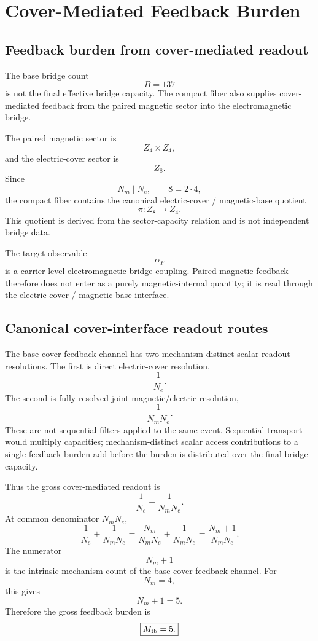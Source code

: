 \section{Cover-Mediated Feedback Burden}

\subsection{Feedback burden from cover-mediated readout}

The base bridge count
\[
B=137
\]
is not the final effective bridge capacity. The compact fiber also
supplies cover-mediated feedback from the paired magnetic sector into
the electromagnetic bridge.

The paired magnetic sector is
\[
Z_4\times Z_4,
\]
and the electric-cover sector is
\[
Z_8.
\]
Since
\[
N_m\mid N_e,
\qquad
8=2\cdot4,
\]
the compact fiber contains the canonical electric-cover / magnetic-base
quotient
\[
\pi:Z_8\to Z_4.
\]
This quotient is derived from the sector-capacity relation and is not
independent bridge data.

The target observable
\[
\alpha_F
\]
is a carrier-level electromagnetic bridge coupling. Paired magnetic
feedback therefore does not enter as a purely magnetic-internal quantity;
it is read through the electric-cover / magnetic-base interface.

\subsection{Canonical cover-interface readout routes}

The base-cover feedback channel has two mechanism-distinct scalar
readout resolutions. The first is direct electric-cover resolution,
\[
\frac{1}{N_e}.
\]
The second is fully resolved joint magnetic/electric resolution,
\[
\frac{1}{N_mN_e}.
\]
These are not sequential filters applied to the same event. Sequential
transport would multiply capacities; mechanism-distinct scalar access
contributions to a single feedback burden add before the burden is
distributed over the final bridge capacity.

Thus the gross cover-mediated readout is
\[
\frac1{N_e}+\frac1{N_mN_e}.
\]
At common denominator \(N_mN_e\),
\[
\frac1{N_e}+\frac1{N_mN_e}
=
\frac{N_m}{N_mN_e}
+
\frac1{N_mN_e}
=
\frac{N_m+1}{N_mN_e}.
\]
The numerator
\[
N_m+1
\]
is the intrinsic mechanism count of the base-cover feedback channel.
For
\[
N_m=4,
\]
this gives
\[
N_m+1=5.
\]
Therefore the gross feedback burden is
\[
\boxed{
M_{\rm fb}=5.
}
\]

